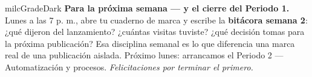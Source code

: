 \documentclass[11pt,letterpaper]{article}
\begin{document}
\begin{infoband}{milcGradeDark}
\textbf{Para la próxima semana --- y el cierre del Periodo 1.} Lunes a las 7 p. m., abre tu cuaderno de marca y escribe la \textbf{bitácora semana 2}: ¿qué dijeron del lanzamiento? ¿cuántas visitas tuviste? ¿qué decisión tomas para la próxima publicación? Esa disciplina semanal es lo que diferencia una marca real de una publicación aislada. Próximo lunes: arrancamos el Periodo 2 --- Automatización y procesos. \emph{Felicitaciones por terminar el primero.}
\end{infoband}
\end{document}
